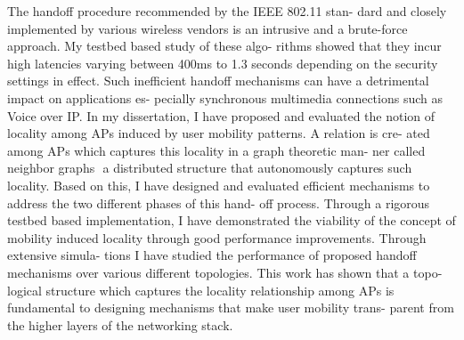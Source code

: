 \documentclass[11pt,letterpaper]{article}
\begin{document}
       The handoff procedure recommended by the IEEE 802.11 stan-
dard and closely implemented by various wireless vendors is an intrusive
and a brute-force approach. My testbed based study of these algo-
rithms showed that they incur high latencies varying between 400ms to
1.3 seconds depending on the security settings in effect. Such inefficient
handoff mechanisms can have a detrimental impact on applications es-
pecially synchronous multimedia connections such as Voice over IP.
       In my dissertation, I have proposed and evaluated the notion of
locality among APs induced by user mobility patterns. A relation is cre-
ated among APs which captures this locality in a graph theoretic man-
ner called neighbor graphs ­ a distributed structure that autonomously
captures such locality. Based on this, I have designed and evaluated
efficient mechanisms to address the two different phases of this hand-
off process. Through a rigorous testbed based implementation, I have
demonstrated the viability of the concept of mobility induced locality
through good performance improvements. Through extensive simula-
tions I have studied the performance of proposed handoff mechanisms
over various different topologies. This work has shown that a topo-
logical structure which captures the locality relationship among APs is
fundamental to designing mechanisms that make user mobility trans-
parent from the higher layers of the networking stack.

\fi



\end{document}
